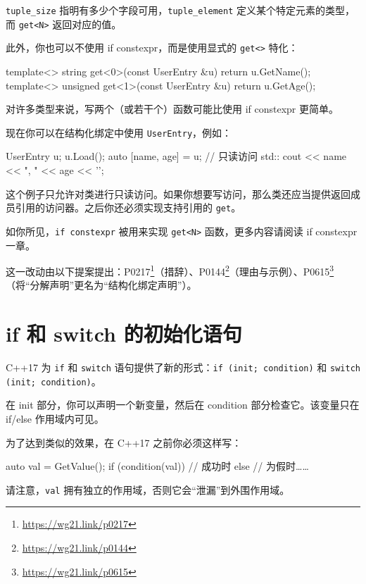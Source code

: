 \texttt{tuple\_size} 指明有多少个字段可用，\texttt{tuple\_element} 定义某个特定元素的类型，而 \texttt{get<N>} 返回对应的值。

此外，你也可以不使用 if constexpr，而是使用显式的 \texttt{get<>} 特化：

\begin{codebox}[cpp]
template<> string get<0>(const UserEntry &u)
{ return u.GetName(); }
template<> unsigned get<1>(const UserEntry &u) { return u.GetAge(); }
\end{codebox}

对许多类型来说，写两个（或若干个）函数可能比使用 if constexpr 更简单。

现在你可以在结构化绑定中使用 \texttt{UserEntry}，例如：

\begin{codebox}[cpp]
UserEntry u;
u.Load();
auto [name, age] = u; // 只读访问
std:: cout << name << ", " << age << '\n';
\end{codebox}

这个例子只允许对类进行只读访问。如果你想要写访问，那么类还应当提供返回成员引用的访问器。之后你还必须实现支持引用的 \texttt{get}。

如你所见，\texttt{if constexpr} 被用来实现 \texttt{get<N>} 函数，更多内容请阅读 if constexpr 一章。

\begin{myInfoBox}
这一改动由以下提案提出：P0217\footnote{\url{https://wg21.link/p0217}}（措辞）、P0144\footnote{\url{https://wg21.link/p0144}}（理由与示例）、P0615\footnote{\url{https://wg21.link/p0615}}（将“分解声明”更名为“结构化绑定声明”）。
\end{myInfoBox}

\section{if 和 switch 的初始化语句}

C++17 为 \texttt{if} 和 \texttt{switch} 语句提供了新的形式：\texttt{if (init; condition)} 和 \texttt{switch (init; condition)}。

在 init 部分，你可以声明一个新变量，然后在 condition 部分检查它。该变量只在 if/else 作用域内可见。

为了达到类似的效果，在 C++17 之前你必须这样写：

\begin{codebox}[cpp]
{
auto val = GetValue();
if (condition(val))
// 成功时
else
// 为假时……
}
\end{codebox}

请注意，\texttt{val} 拥有独立的作用域，否则它会“泄漏”到外围作用域。

